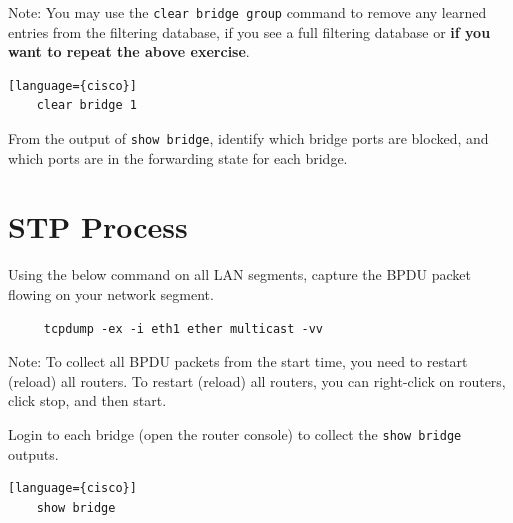 \documentclass{UTNetLab}
\begin{document}
    Note: You may use the \lstinline[language={cisco}, emph={group}]{clear bridge group} command to remove any learned entries from the filtering database, if you see a full filtering database or \textbf{if you want to repeat the above exercise}.     
    
    \begin{lstlisting}[frame=trBL][language={cisco}]
    clear bridge 1
    \end{lstlisting}
 
    \begin{report}
    \item From the output of \lstinline[language={cisco}]{show bridge}, identify which bridge ports are blocked, and which ports are in the forwarding state for each bridge. \newline 
	
\end{report}

\section{STP Process}
    Using the below command on all LAN segments, capture the BPDU packet flowing on your network segment.
    
    \begin{lstlisting}
     tcpdump -ex -i eth1 ether multicast -vv
    \end{lstlisting}
    
   Note: To collect all BPDU packets from the start time, you need to restart (reload) all routers. To restart (reload) all routers, you can right-click on routers, click stop, and then start.

    Login to each bridge (open the router console) to collect the \lstinline[language={cisco}]{show bridge} outputs.
    
    \begin{lstlisting}[frame=trBL][language={cisco}]
    show bridge
    \end{lstlisting}
    
\end{document}
